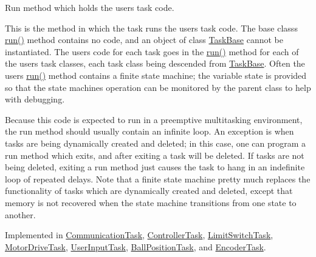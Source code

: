 Run method which holds the user\textquotesingle{}s task code. 

This is the method in which the task runs the user\textquotesingle{}s task code. The base class\textquotesingle{}s {\ttfamily \mbox{\hyperlink{class_task_base_adcf6036ad9c860051ccf392ba5e7dbbc}{run()}}} method contains no code, and an object of class {\ttfamily \mbox{\hyperlink{class_task_base}{Task\+Base}}} cannot be instantiated. The user\textquotesingle{}s code for each task goes in the {\ttfamily \mbox{\hyperlink{class_task_base_adcf6036ad9c860051ccf392ba5e7dbbc}{run()}}} method for each of the user\textquotesingle{}s task classes, each task class being descended from {\ttfamily \mbox{\hyperlink{class_task_base}{Task\+Base}}}. Often the user\textquotesingle{}s {\ttfamily \mbox{\hyperlink{class_task_base_adcf6036ad9c860051ccf392ba5e7dbbc}{run()}}} method contains a finite state machine; the variable {\ttfamily state} is provided so that the state machine\textquotesingle{}s operation can be monitored by the parent class to help with debugging.

Because this code is expected to run in a preemptive multitasking environment, the run method should usually contain an infinite loop. An exception is when tasks are being dynamically created and deleted; in this case, one can program a run method which exits, and after exiting a task will be deleted. If tasks are not being deleted, exiting a run method just causes the task to hang in an indefinite loop of repeated delays. Note that a finite state machine pretty much replaces the functionality of tasks which are dynamically created and deleted, except that memory is not recovered when the state machine transitions from one state to another. 

Implemented in \mbox{\hyperlink{class_communication_task_a33c23712d6b6952d3e7fb180bab34a83}{Communication\+Task}}, \mbox{\hyperlink{class_controller_task_adb32c437ea51d258b986414ab48c6180}{Controller\+Task}}, \mbox{\hyperlink{class_limit_switch_task_abf943a0f6ab5ab5fa9588f9cdbc6bc82}{Limit\+Switch\+Task}}, \mbox{\hyperlink{class_motor_drive_task_abc617fef420f9dc8cdd6144d8d7adea8}{Motor\+Drive\+Task}}, \mbox{\hyperlink{class_user_input_task_a03666bddf33829bd1eb0dfcfd7f7075b}{User\+Input\+Task}}, \mbox{\hyperlink{class_ball_position_task_aa48c00fc26b05fe4f3c0cc8eed70fce4}{Ball\+Position\+Task}}, and \mbox{\hyperlink{class_encoder_task_a4dfd013fe548038f941ab130adeb90fd}{Encoder\+Task}}.

\mbox{\label{class_task_base_a1a6f54b0b07cf27d5764c4dca5ec5fcf}} 
